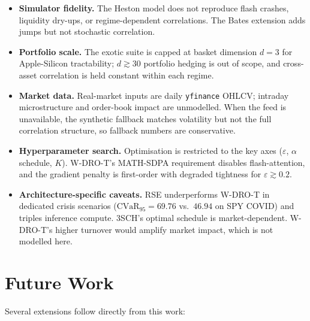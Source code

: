 \documentclass[11pt,oneside]{report}
\newcommand{\cvar}{\mathrm{CVaR}}
\begin{document}
\begin{itemize}
  \item \textbf{Simulator fidelity.} The Heston model does not reproduce flash crashes, liquidity dry-ups, or regime-dependent correlations. The Bates extension adds jumps but not stochastic correlation.
  \item \textbf{Portfolio scale.} The exotic suite is capped at basket dimension $d = 3$ for Apple-Silicon tractability; $d \gtrsim 30$ portfolio hedging is out of scope, and cross-asset correlation is held constant within each regime.
  \item \textbf{Market data.} Real-market inputs are daily \texttt{yfinance} OHLCV; intraday microstructure and order-book impact are unmodelled. When the feed is unavailable, the synthetic fallback matches volatility but not the full correlation structure, so fallback numbers are conservative.
  \item \textbf{Hyperparameter search.} Optimisation is restricted to the key axes ($\varepsilon$, $\alpha$ schedule, $K$). W-DRO-T's MATH-SDPA requirement disables flash-attention, and the gradient penalty is first-order with degraded tightness for $\varepsilon \gtrsim 0.2$.
  \item \textbf{Architecture-specific caveats.} RSE underperforms W-DRO-T in dedicated crisis scenarios ($\cvar_{95} = 69.76$ vs.\ $46.94$ on SPY COVID) and triples inference compute. 3SCH's optimal schedule is market-dependent. W-DRO-T's higher turnover would amplify market impact, which is not modelled here.
\end{itemize}


\section{Future Work}
\label{sec:future}

Several extensions follow directly from this work:
\end{document}

